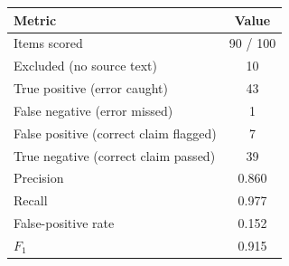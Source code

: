 \begin{tabular}{lc}
\toprule
 Metric & Value \\
\midrule
 Items scored & 90 / 100 \\
 Excluded (no source text) & 10 \\
\midrule
 True positive (error caught) & 43 \\
 False negative (error missed) & 1 \\
 False positive (correct claim flagged) & 7 \\
 True negative (correct claim passed) & 39 \\
\midrule
 Precision & 0.860 \\
 Recall & 0.977 \\
 False-positive rate & 0.152 \\
 $F_1$ & 0.915 \\
\bottomrule
\end{tabular}
